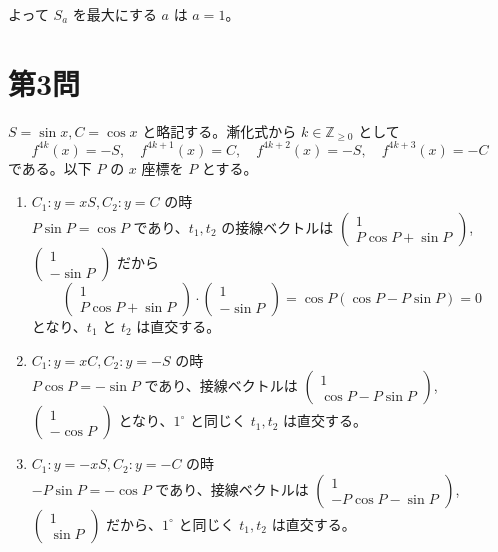 \documentclass[../main.tex]{subfiles}
\begin{document}
\noindent
よって $S_a$ を最大にする $a$ は $a = 1$。

\newpage

\section*{第3問}

\noindent
[\textbf{解}] $S = \sin x, C = \cos x$ と略記する。漸化式から $k \in \mathbb{Z}_{\ge 0}$ として
\[
  f^{4k}(x) = -S, \quad f^{4k+1}(x) = C, \quad f^{4k+2}(x) = -S, \quad f^{4k+3}(x) = -C
\]
である。以下 $P$ の $x$ 座標を $P$ とする。

\begin{enumerate}
  \item[$1^\circ$] $C_1 : y = xS, C_2 : y = C$ の時\\
    $P \sin P = \cos P$ であり、$t_1, t_2$ の接線ベクトルは $
    \begin{pmatrix} 1 \\ P \cos P + \sin P
    \end{pmatrix}$, $
    \begin{pmatrix} 1 \\ -\sin P
    \end{pmatrix}$ だから
    \[
      \begin{pmatrix} 1 \\ P \cos P + \sin P
      \end{pmatrix} \cdot
      \begin{pmatrix} 1 \\ -\sin P
      \end{pmatrix} = \cos P (\cos P - P \sin P) = 0
    \]
    となり、$t_1$ と $t_2$ は直交する。

  \item[$2^\circ$] $C_1 : y = xC, C_2 : y = -S$ の時\\
    $P \cos P = -\sin P$ であり、接線ベクトルは $
    \begin{pmatrix} 1 \\ \cos P - P \sin P
    \end{pmatrix}$, $
    \begin{pmatrix} 1 \\ -\cos P
    \end{pmatrix}$ となり、$1^\circ$ と同じく $t_1, t_2$ は直交する。

  \item[$3^\circ$] $C_1 : y = -xS, C_2 : y = -C$ の時\\
    $-P \sin P = -\cos P$ であり、接線ベクトルは $
    \begin{pmatrix} 1 \\ -P \cos P - \sin P
    \end{pmatrix}$, $
    \begin{pmatrix} 1 \\ \sin P
    \end{pmatrix}$ だから、$1^\circ$ と同じく $t_1, t_2$ は直交する。


\end{enumerate}
\end{document}
